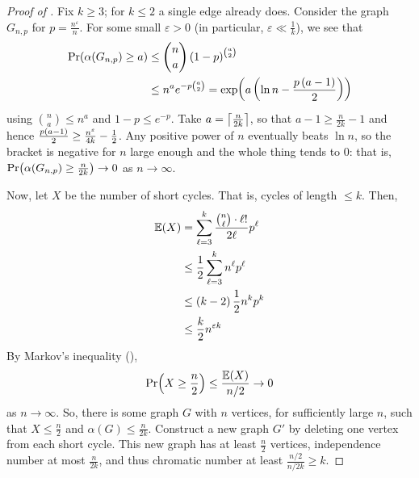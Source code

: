 \begin{proof}[Proof of ]
    Fix $k \geq 3$; for $k \leq 2$ a single edge already does. Consider the graph $G_{n, p}$ for $p = \frac{n^{\varepsilon}}{n}$. For some small $\varepsilon > 0$ (in particular, $\varepsilon \ll \frac{1}{k}$), we see that
    \begin{align*}
        \Pr\!\left( \alpha\!\left( G_{n, p} \right) \geq a \right) &\leq \binom{n}{a} \left( 1 - p \right)^{\binom{a}{2}}  \\
        & \leq n^a e^{-p \binom{a}{2}} = \exp\!\left( a \left( \ln n - \frac{p \left( a - 1 \right)}{2} \right) \right)
    \end{align*}
    using $\binom{n}{a} \leq n^a$ and $1 - p \leq e^{-p}$. Take $a = \left\lceil \frac{n}{2k} \right\rceil$, so that $a - 1 \geq \frac{n}{2k} - 1$ and hence $\frac{p \left( a - 1 \right)}{2} \geq \frac{n^{\varepsilon}}{4k} - \frac{1}{2}$. Any positive power of $n$ eventually beats $\ln n$, so the bracket is negative for $n$ large enough and the whole thing tends to $0$: that is, $\Pr\!\left( \alpha\!\left( G_{n, p} \right) \geq \frac{n}{2k} \right) \to 0$ as $n \to \infty$.

    Now, let $X$ be the number of short cycles. That is, cycles of length $\leq k$. Then,
    \begin{align*}
        \mathbb{E}(X) &= \sum_{\ell = 3}^{k} \frac{\binom{n}{\ell} \cdot \ell !}{2\ell} p^{\ell} \\
        &\leq \frac{1}{2} \sum_{\ell = 3}^{k} n^{\ell} p^{\ell} \\
        &\leq \left( k - 2 \right) \frac{1}{2} n^k p^k \\
        &\leq \frac{k}{2} n^{\varepsilon k}
    \end{align*}
    By Markov's inequality (),
    \begin{align*}
        \Pr\!\left( X \geq \frac{n}{2} \right) \leq \frac{\mathbb{E}(X)}{n / 2} \to 0
    \end{align*}
    as $n \to \infty$. So, there is some graph $G$ with $n$ vertices, for sufficiently large $n$, such that $X \leq \frac{n}{2}$ and $\alpha(G) \leq \frac{n}{2k}$. Construct a new graph $G'$ by deleting one vertex from each short cycle. This new graph has at least $\frac{n}{2}$ vertices, independence number at most $\frac{n}{2k}$, and thus chromatic number at least $\frac{n/2}{n/2k} \geq k$.
\end{proof}
